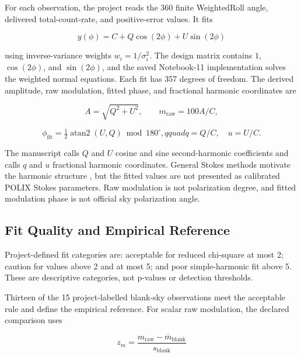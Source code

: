 \documentclass[conference]{IEEEtran}
\begin{document}
For each observation, the project reads the 360 finite WeightedRoll angle, delivered total-count-rate, and positive-error values. It fits


\begin{equation*}
y(\phi)=C+Q\cos(2\phi)+U\sin(2\phi)
\end{equation*}

using inverse-variance weights $w_i=1/\sigma_i^2$. The design matrix contains $1$, $\cos(2\phi)$, and $\sin(2\phi)$, and the saved Notebook-11 implementation solves the weighted normal equations. Each fit has 357 degrees of freedom. The derived amplitude, raw modulation, fitted phase, and fractional harmonic coordinates are


\begin{equation*}
A=\sqrt{Q^2+U^2},\qquad
m_{\mathrm{raw}}=100A/C,
\end{equation*}

\begin{equation*}
\phi_{\mathrm{fit}}=\tfrac12\operatorname{atan2}(U,Q)\bmod180^\circ,qquad
q=Q/C,\quad u=U/C.
\end{equation*}

The manuscript calls $Q$ and $U$ cosine and sine second-harmonic coefficients and calls $q$ and $u$ fractional harmonic coordinates. General Stokes methods motivate the harmonic structure \cite{kislat2015stokes}, but the fitted values are not presented as calibrated POLIX Stokes parameters. Raw modulation is not polarization degree, and fitted modulation phase is not official sky polarization angle.


\subsection{Fit Quality and Empirical Reference}

Project-defined fit categories are: acceptable for reduced chi-square at most 2; caution for values above 2 and at most 5; and poor simple-harmonic fit above 5. These are descriptive categories, not p-values or detection thresholds.


Thirteen of the 15 project-labelled blank-sky observations meet the acceptable rule and define the empirical reference. For scalar raw modulation, the declared comparison uses


\begin{equation*}
z_m=\frac{m_{\mathrm{raw}}-\bar m_{\mathrm{blank}}}{s_{\mathrm{blank}}}
\end{equation*}
\end{document}
